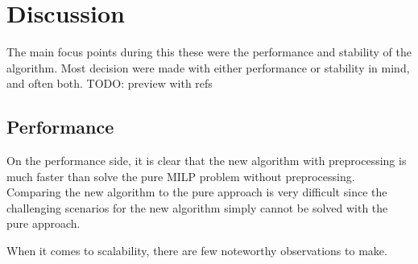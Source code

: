 \chapter{Discussion}
\label{section:discussion}
The main focus points during this these were the performance and stability of the algorithm. Most decision were made with either performance or stability in mind, and often both. TODO: preview with refs
\section{Performance}
On the performance side, it is clear that the new algorithm with preprocessing is much faster than solve the pure MILP problem without preprocessing. Comparing the new algorithm to the pure approach is very difficult since the challenging scenarios for the new algorithm simply cannot be solved with the pure approach.
\par
When it comes to scalability, there are few noteworthy observations to make. 
